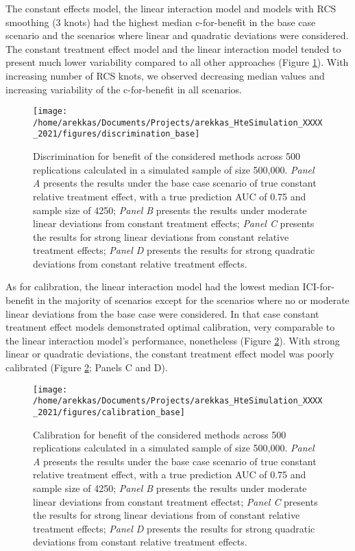 \documentclass{article}
\begin{document}
The constant effects model, the linear interaction model and models with
RCS smoothing (3 knots) had the highest median c-for-benefit in the base
case scenario and the scenarios where linear and quadratic deviations
were considered. The constant treatment effect model and the linear
interaction model tended to present much lower variability compared to
all other approaches (Figure \ref{fig:discrimination}). With increasing
number of RCS knots, we observed decreasing median values and increasing
variability of the c-for-benefit in all scenarios.

\begin{figure}
\texttt{[image: /home/arekkas/Documents/Projects/arekkas\_HteSimulation\_XXXX\_2021/figures/discrimination\_base]} \caption{Discrimination for benefit of the considered methods across 500 replications calculated in a simulated sample of size 500,000. \textit{Panel A} presents the results under the base case scenario of true constant relative treatment effect, with a true prediction AUC of 0.75 and sample size of 4250; \textit{Panel B} presents the results under moderate linear deviations from constant treatment effects; \textit{Panel C} presents the results for strong linear deviations from constant relative treatment effects; \textit{Panel D} presents the results for strong quadratic deviations from constant relative treatment effects.}\label{fig:discrimination}
\end{figure}

As for calibration, the linear interaction model had the lowest median
ICI-for-benefit in the majority of scenarios except for the scenarios
where no or moderate linear deviations from the base case were
considered. In that case constant treatment effect models demonstrated
optimal calibration, very comparable to the linear interaction model's
performance, nonetheless (Figure \ref{fig:calibration}). With strong
linear or quadratic deviations, the constant treatment effect model was
poorly calibrated (Figure \ref{fig:calibration}; Panels C and D).

\begin{figure}
\texttt{[image: /home/arekkas/Documents/Projects/arekkas\_HteSimulation\_XXXX\_2021/figures/calibration\_base]} \caption{Calibration for benefit of the considered methods across 500 replications calculated in a simulated sample of size 500,000. \textit{Panel A} presents the results under the base case scenario of true constant relative treatment effect, with a true prediction AUC of 0.75 and sample size of 4250; \textit{Panel B} presents the results under moderate linear deviations from constant treatment effectst; \textit{Panel C} presents the results for strong linear deviations from of constant relative treatment effects; \textit{Panel D} presents the results for strong quadratic deviations from constant relative treatment effects.}\label{fig:calibration}
\end{figure}
\end{document}

